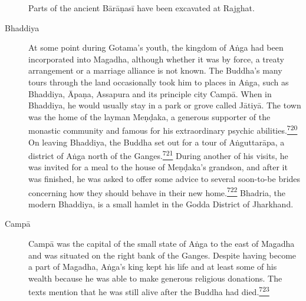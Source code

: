 \begin{description}
Parts of the ancient Bārāṇasī have been excavated at Rajghat.
\item[Bhaddiya]
At some point during Gotama's youth, the kingdom of Aṅga had been
incorporated into Magadha, although whether it was by force, a treaty
arrangement or a marriage alliance is not known. The Buddha's many tours
through the land occasionally took him to places in Aṅga, such as
Bhaddiya, Āpaṇa, Assapura and its principle city Campā. When in
Bhaddiya, he would usually stay in a park or grove called Jātiyā. The
town was the home of the layman Meṇḍaka, a generous supporter of the
monastic community and famous for his extraordinary psychic
abilities.\label{footprints_split_019.html_fnref720}\hyperref[footprints_split_025.htmlux5cux23fn720]{\textsuperscript{720}}
On leaving Bhaddiya, the Buddha set out for a tour of Aṅguttarāpa, a
district of Aṅga north of the
Ganges.\label{footprints_split_019.html_fnref721}\hyperref[footprints_split_025.htmlux5cux23fn721]{\textsuperscript{721}}
During another of his visits, he was invited for a meal to the house of
Meṇḍaka's grandson, and after it was finished, he was asked to offer
some advice to several soon-to-be brides concerning how they should
behave in their new
home.\label{footprints_split_019.html_fnref722}\hyperref[footprints_split_025.htmlux5cux23fn722]{\textsuperscript{722}}
Bhadria, the modern Bhaddiya, is a small hamlet in the Godda District of
Jharkhand.
\item[Campā]
Campā was the capital of the small state of Aṅga to the east of Magadha
and was situated on the right bank of the Ganges. Despite having become
a part of Magadha, Aṅga's king kept his life and at least some of his
wealth because he was able to make generous religious donations. The
texts mention that he was still alive after the Buddha had
died.\label{footprints_split_019.html_fnref723}\hyperref[footprints_split_025.htmlux5cux23fn723]{\textsuperscript{723}}


\end{description}
